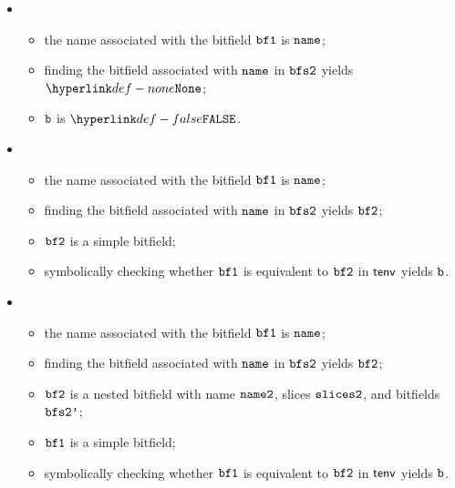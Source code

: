 \ProseParagraph
\OneApplies
\begin{itemize}
  \item {}
  \begin{itemize}
    \item the name associated with the bitfield $\texttt{bf1}$ is $\texttt{name}$;
    \item finding the bitfield associated with $\texttt{name}$ in $\texttt{bfs2}$ yields $\None$;
    \item $\texttt{b}$ is $\False$.
  \end{itemize}

  \item {}
  \begin{itemize}
    \item the name associated with the bitfield $\texttt{bf1}$ is $\texttt{name}$;
    \item finding the bitfield associated with $\texttt{name}$ in $\texttt{bfs2}$ yields $\texttt{bf2}$;
    \item $\texttt{bf2}$ is a simple bitfield;
    \item symbolically checking whether $\texttt{bf1}$ is equivalent to $\texttt{bf2}$ in $\textsf{tenv}$ yields $\texttt{b}$.
  \end{itemize}

  \item {}
  \begin{itemize}
    \item the name associated with the bitfield $\texttt{bf1}$ is $\texttt{name}$;
    \item finding the bitfield associated with $\texttt{name}$ in $\texttt{bfs2}$ yields $\texttt{bf2}$;
    \item $\texttt{bf2}$ is a nested bitfield with name $\texttt{name2}$, slices $\texttt{slices2}$, and bitfields $\texttt{bfs2'}$;
    \item $\texttt{bf1}$ is a simple bitfield;
    \item symbolically checking whether $\texttt{bf1}$ is equivalent to $\texttt{bf2}$ in $\textsf{tenv}$ yields $\texttt{b}$.
  \end{itemize}


\end{itemize}
